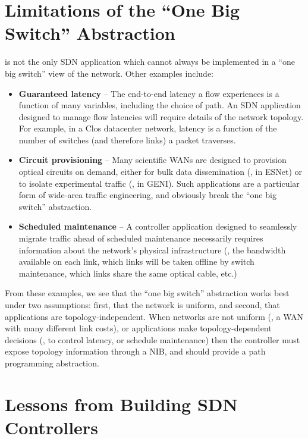 \section{Limitations of the ``One Big Switch'' Abstraction}
\label{sec:one-big-switch}

\sys is not the only SDN application which cannot always be implemented in a ``one big switch''
view of the network. Other examples include:

\begin{itemize}
\item {\bf Guaranteed latency} -- The end-to-end latency a flow experiences is a function of
many variables, including the choice of path. An SDN application designed to manage flow
latencies will require details of the network topology. For example, in a Clos datacenter network,
latency is a function of the number of switches (and therefore links) a packet traverses.

\item {\bf Circuit provisioning} -- Many scientific WANs are designed to provision optical circuits
on demand, either for bulk data dissemination (\eg, in ESNet) or to isolate experimental traffic
(\eg, in GENI). Such applications are a particular form of wide-area traffic engineering, and
obviously break the ``one big switch'' abstraction.

\item {\bf Scheduled maintenance} -- A controller application designed to seamlessly migrate
traffic ahead of scheduled maintenance necessarily requires information about the network's
physical infrastructure (\eg, the bandwidth available on each link, which links will be taken
offline by switch maintenance, which links share the same optical cable, etc.)
\end{itemize}

From these examples, we see that the ``one big switch'' abstraction works best under two
assumptions: first, that the network is uniform, and second, that applications are topology-independent.
When networks are not uniform (\eg, a WAN with many different link costs), or applications
make topology-dependent decisions (\eg, to control latency, or schedule maintenance) then
the controller must expose topology information through a NIB, and should provide a path
programming abstraction.

\section{Lessons from Building SDN Controllers}
\label{sec:building-controllers}


